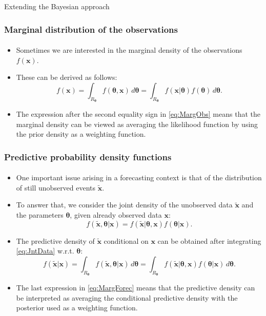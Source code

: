 \documentclass[10pt]{beamer}
\theoremstyle{definition}
\begin{document}
\begin{section}{Extending the Bayesian approach}
\begin{frame}[fragile]
\frametitle{Marginal distribution of the observations}
\framesubtitle{}
\begin{itemize}\itemsep1em
\item Sometimes we are interested in the marginal density of the observations $f(\mathbf{x})$.
\item These can be derived as follows:
\begin{equation}
\label{eq:MargObs}f(\mathbf{x})=\int_{R_{\boldsymbol{\theta}}}f(\boldsymbol{\theta},\mathbf{x})\,d\boldsymbol{\theta}=\int_{R_{\boldsymbol{\theta}}}f(\mathbf{x}|\boldsymbol{\theta})f(\boldsymbol{\theta})\,d\boldsymbol{\theta}.
\end{equation}
\item The expression after the second equality sign in \eqref{eq:MargObs} means that the marginal density can be viewed as averaging the likelihood function by using the prior density as a weighting function.
\end{itemize}
\end{frame}

\begin{frame}[fragile]
\frametitle{Predictive probability density functions}
\framesubtitle{}
\begin{itemize}\itemsep1em
\item One important issue arising in a forecasting context is that of the distribution of still unobserved events $\mathbf{\tilde{x}}$.
\item To answer that, we consider the joint density of the unobserved data $\mathbf{\tilde{x}}$ and the parameters $\boldsymbol{\theta}$, given already observed data $\mathbf{x}$:
\begin{equation}
\label{eq:JntData}
f(\mathbf{\tilde{x}},\boldsymbol{\theta}|\mathbf{x})=f(\mathbf{\tilde{x}}|\boldsymbol{\theta},\mathbf{x})f(\boldsymbol{\theta}|\mathbf{x}).
\end{equation}
\item The predictive density of $\mathbf{\tilde{x}}$ conditional on $\mathbf{x}$ can be obtained after integrating \eqref{eq:JntData} w.r.t. $\boldsymbol{\theta}$:
\begin{equation}
\label{eq:MargForec}
f(\mathbf{\tilde{x}}|\mathbf{x})=\int_{R_{\boldsymbol{\theta}}}f(\mathbf{\tilde{x}},\boldsymbol{\theta}|\mathbf{x})\,d\boldsymbol{\theta}=\int_{R_{\boldsymbol{\theta}}}f(\mathbf{\tilde{x}}|\boldsymbol{\theta},\mathbf{x})f(\boldsymbol{\theta}|\mathbf{x})\,d\boldsymbol{\theta}.
\end{equation}
\item The last expression in \eqref{eq:MargForec} means that the predictive density can be interpreted as averaging the conditional predictive density with the posterior used as a weighting function.
\end{itemize}
\end{frame}


\end{section}
\end{document}
